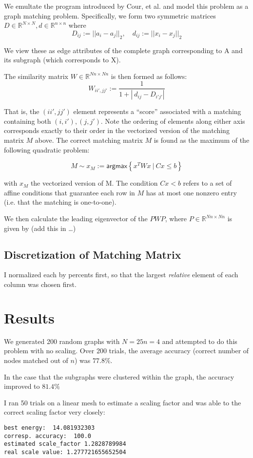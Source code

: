 \documentclass[10pt,twocolumn]{article}
\providecommand{\R}{\mathbb{R}}%
\begin{document}
We emultate the program introduced by Cour, et al.\cite{citation01} and model
this problem as a graph matching problem.
Specifically, we form two symmetric matrices
$D\in\R^{N \times N} , d\in\R^{n \times n}$ where
\[
  D_{ij} := || a_i - a_j ||_2 ,  \quad d_{ij} := || x_i - x_j ||_2
\]

We view these as edge attributes of the complete graph corresponding to A and its subgraph (which corresponds to X).

The similarity matrix $W \in \R^{Nn \times Nn}$ is then formed as follows:
\[
  W_{ii',jj'} := \frac{1}{1 + \left| \  d_{ij} - D_{i'j'}  \right| }
\]

That is, the $(ii',jj')$ element represents a ``score'' associated with a
matching containing both $(i,i'),(j,j')$. Note the ordering of elements along
either axis corresponds exactly to their order in the vectorized version of the
matching matrix $M$ above. The correct matching matrix $M$ is found as the
maximum of the following quadratic problem:

\[
  M \sim x_M := \mathsf{argmax} \left\{ x^T W x \ | \ Cx \leq b \right\}
\]

with $x_M$ the vectorized version of M. The condition $Cx<b$ refers to a set of
affine conditions that guarantee each row in $M$ has at most one nonzero entry
(i.e. that the matching is one-to-one).


We then calculate the leading eigenvector of the $PWP$, where
$P \in \R^{Nn \times Nn}$ is given by (add this in \dots)

\subsection{Discretization of Matching Matrix}
I normalized each by percents first, so that the largest \emph{relative} element of each column was chosen first.

\section{Results}

We generated 200 random graphs with $N=25 n=4$ and attempted to do this problem with no scaling.
Over 200 trials, the average accuracy (correct number of nodes matched out of $n$) was $77.8\%$.

In the case that the subgraphs were clustered within the graph, the accuracy improved to $81.4\%$

I ran 50 trials on a linear mesh to estimate a scaling factor and was able to the correct scaling factor very closely:
\begin{verbatim}
best energy:  14.081932303
corresp. accuracy:  100.0
estimated scale_factor 1.2828789984
real scale value: 1.277721655652504
\end{verbatim}
\end{document}
